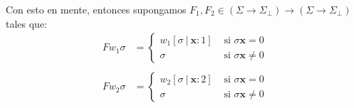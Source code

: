\documentclass{article}
\newcommand{\x}{\textbf{x}}
\newcommand{\cdom}{\Sigma \to \Sigma_\bot}
\begin{document}
Con esto en mente, entonces supongamos $F_1, F_2 \in (\cdom) \to (\cdom)$ tales que:
\begin{equation*}
  \begin{aligned}
    F w_1 \sigma &= \begin{cases}
      w_1 [\sigma\ |\ \x : 1] &\text{ si } \sigma\x = 0 \\ 
      \sigma &\text{ si }\sigma\x \neq 0
    \end{cases} \\ 
    \\ 
      F w_2 \sigma &= \begin{cases}
        w_2 [\sigma\ |\ \x : 2] &\text{ si }\sigma\x = 0 \\ 
        \sigma &\text{ si }\sigma\x \neq 0
      \end{cases}
  \end{aligned}
\end{equation*}
\end{document}
